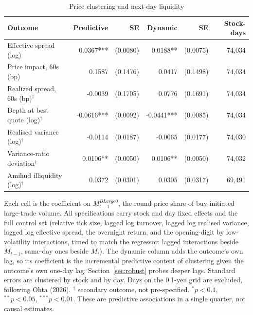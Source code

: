 \begin{table}[htbp]
\centering
\caption{Price clustering and next-day liquidity}
\label{tab:rq2}
\small
\begin{threeparttable}
\begin{tabular}{@{}lrrrrr@{}}
\toprule
Outcome & Predictive & SE & Dynamic & SE & Stock-days \\
\midrule
Effective spread (log) & 0.0367*** & (0.0080) & 0.0188** & (0.0075) & 74,034 \\
Price impact, 60s (bp) & 0.1587 & (0.1476) & 0.0417 & (0.1498) & 74,034 \\
Realized spread, 60s (bp)$^{\dagger}$ & -0.0039 & (0.1705) & 0.0776 & (0.1691) & 74,034 \\
Depth at best quote (log)$^{\dagger}$ & -0.0616*** & (0.0092) & -0.0441*** & (0.0085) & 74,034 \\
Realised variance (log)$^{\dagger}$ & -0.0114 & (0.0187) & -0.0065 & (0.0177) & 74,030 \\
Variance-ratio deviation$^{\dagger}$ & 0.0106** & (0.0050) & 0.0106** & (0.0050) & 74,032 \\
Amihud illiquidity (log)$^{\dagger}$ & 0.0372 & (0.0301) & 0.0305 & (0.0317) & 69,491 \\
\bottomrule
\end{tabular}
\begin{tablenotes}[flushleft]\footnotesize
\item Each cell is the coefficient on $M^{BLarge0}_{t-1}$, the round-price share of buy-initiated large-trade volume. All specifications carry stock and day fixed effects and the full control set (relative tick size, lagged log turnover, lagged log realised variance, lagged log effective spread, the overnight return, and the opening-digit by low-volatility interactions, timed to match the regressor: lagged interactions beside $M_{t-1}$, same-day ones beside $M_t$). The dynamic column adds the outcome's own lag, so its coefficient is the incremental predictive content of clustering given the outcome's own one-day lag; Section~\ref{sec:robust} probes deeper lags. Standard errors are clustered by stock and by day. Days on the 0.1-yen grid are excluded, following Ohta (2026). $^{\dagger}$ secondary outcome, not pre-specified. $^{*}p<0.1$, $^{**}p<0.05$, $^{***}p<0.01$. These are predictive associations in a single quarter, not causal estimates.
\end{tablenotes}
\end{threeparttable}
\end{table}
